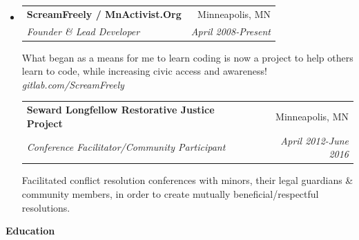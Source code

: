 \documentclass[letterpaper,11pt]{article}
\makeatletter
\newcommand{\resheading}[1]{{\Large {\textbf{#1 \vphantom{p\^{E}}}}}}
\newcommand{\ressubheading}[4]{
\begin{tabular*}{6.75in}{l@{\extracolsep{\fill}}r}
		\textbf{#1} & #2 \\
		\textit{#3} & \textit{#4} \\
\end{tabular*}\vspace{-6pt}}
\makeatother
\begin{document}



\begin{itemize}[label={}]

\item
	\ressubheading{ScreamFreely / MnActivist.Org}{Minneapolis, MN}{Founder \& Lead Developer}{April 2008-Present}

\vspace{.25cm}

What began as a means for me to learn coding is now a project to help others learn to code, while increasing civic access and awareness! \textit{gitlab.com/ScreamFreely}	

\vspace{.25cm}

	\ressubheading{Seward Longfellow Restorative Justice Project}{Minneapolis, MN}{Conference Facilitator/Community Participant}{April 2012-June 2016}

\vspace{.25cm}

Facilitated conflict resolution conferences with minors, their legal guardians \& community members, in order to create mutually beneficial/respectful resolutions.

\end{itemize}



\vspace{.25cm}

\resheading{Education}

\vspace{.2cm}
\end{document}
